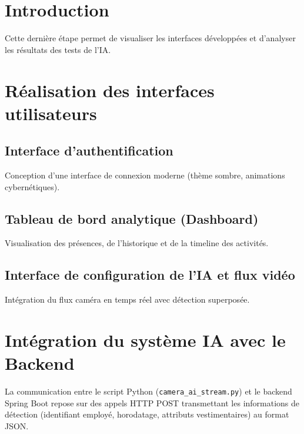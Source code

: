 \documentclass[12pt,a4paper]{report}
\begin{document}
\section{Introduction}
Cette dernière étape permet de visualiser les interfaces développées et d'analyser les résultats des tests de l'IA.

\section{Réalisation des interfaces utilisateurs}

\subsection{Interface d'authentification}
Conception d'une interface de connexion moderne (thème sombre, animations cybernétiques).


\subsection{Tableau de bord analytique (Dashboard)}
Visualisation des présences, de l'historique et de la timeline des activités.


\subsection{Interface de configuration de l'IA et flux vidéo}
Intégration du flux caméra en temps réel avec détection superposée.

\section{Intégration du système IA avec le Backend}
La communication entre le script Python (\texttt{camera\_ai\_stream.py}) et le backend Spring Boot
repose sur des appels HTTP POST transmettant les informations de détection (identifiant employé,
horodatage, attributs vestimentaires) au format JSON.
\end{document}
